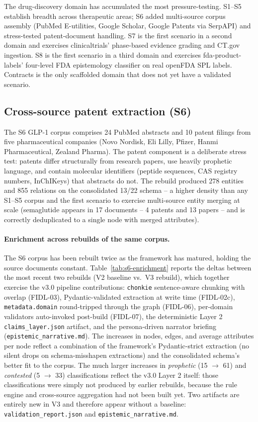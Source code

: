 The drug-discovery domain has accumulated the most pressure-testing. S1--S5 establish breadth across therapeutic areas; S6 added multi-source corpus assembly (PubMed E-utilities, Google Scholar, Google Patents via SerpAPI) and stress-tested patent-document handling. S7 is the first scenario in a second domain and exercises clinicaltrials' phase-based evidence grading and CT.gov ingestion. S8 is the first scenario in a third domain and exercises fda-product-labels' four-level FDA epistemology classifier on real openFDA SPL labels. Contracts is the only scaffolded domain that does not yet have a validated scenario.

\subsection{Cross-source patent extraction (S6)}

The S6 GLP-1 corpus comprises 24 PubMed abstracts and 10 patent filings from five pharmaceutical companies (Novo Nordisk, Eli Lilly, Pfizer, Hanmi Pharmaceutical, Zealand Pharma). The patent component is a deliberate stress test: patents differ structurally from research papers, use heavily prophetic language, and contain molecular identifiers (peptide sequences, CAS registry numbers, InChIKeys) that abstracts do not. The rebuild produced 278 entities and 855 relations on the consolidated 13/22 schema -- a higher density than any S1--S5 corpus and the first scenario to exercise multi-source entity merging at scale (semaglutide appears in 17 documents -- 4 patents and 13 papers -- and is correctly deduplicated to a single node with merged attributes).

\paragraph{Enrichment across rebuilds of the same corpus.} The S6 corpus has been rebuilt twice as the framework has matured, holding the source documents constant. Table~\ref{tab:s6-enrichment} reports the deltas between the most recent two rebuilds (V2 baseline vs.\ V3 rebuild), which together exercise the v3.0 pipeline contributions: \texttt{chonkie} sentence-aware chunking with overlap (FIDL-03), Pydantic-validated extraction at write time (FIDL-02c), \texttt{metadata.domain} round-tripped through the graph (FIDL-06), per-domain validators auto-invoked post-build (FIDL-07), the deterministic Layer 2 \texttt{claims\_layer.json} artifact, and the persona-driven narrator briefing (\texttt{epistemic\_narrative.md}). The increases in nodes, edges, and average attributes per node reflect a combination of the framework's Pydantic-strict extraction (no silent drops on schema-misshapen extractions) and the consolidated schema's better fit to the corpus. The much larger increases in \emph{prophetic} (15 $\to$ 61) and \emph{contested} (5 $\to$ 33) classifications reflect the v3.0 Layer 2 itself: those classifications were simply not produced by earlier rebuilds, because the rule engine and cross-source aggregation had not been built yet. Two artifacts are entirely new in V3 and therefore appear without a baseline: \texttt{validation\_report.json} and \texttt{epistemic\_narrative.md}.


